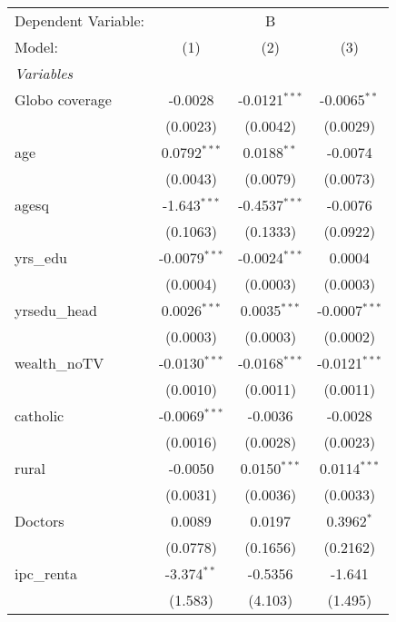 
\begingroup
\centering
\begin{tabular}{lccc}
   \tabularnewline \midrule \midrule
   Dependent Variable: & \multicolumn{3}{c}{B}\\
   Model:         & (1)             & (2)             & (3)\\  
   \midrule
   \emph{Variables}\\
   Globo coverage & -0.0028         & -0.0121$^{***}$ & -0.0065$^{**}$\\   
                  & (0.0023)        & (0.0042)        & (0.0029)\\   
   age            & 0.0792$^{***}$  & 0.0188$^{**}$   & -0.0074\\   
                  & (0.0043)        & (0.0079)        & (0.0073)\\   
   agesq          & -1.643$^{***}$  & -0.4537$^{***}$ & -0.0076\\   
                  & (0.1063)        & (0.1333)        & (0.0922)\\   
   yrs\_edu       & -0.0079$^{***}$ & -0.0024$^{***}$ & 0.0004\\   
                  & (0.0004)        & (0.0003)        & (0.0003)\\   
   yrsedu\_head   & 0.0026$^{***}$  & 0.0035$^{***}$  & -0.0007$^{***}$\\   
                  & (0.0003)        & (0.0003)        & (0.0002)\\   
   wealth\_noTV   & -0.0130$^{***}$ & -0.0168$^{***}$ & -0.0121$^{***}$\\   
                  & (0.0010)        & (0.0011)        & (0.0011)\\   
   catholic       & -0.0069$^{***}$ & -0.0036         & -0.0028\\   
                  & (0.0016)        & (0.0028)        & (0.0023)\\   
   rural          & -0.0050         & 0.0150$^{***}$  & 0.0114$^{***}$\\   
                  & (0.0031)        & (0.0036)        & (0.0033)\\   
   Doctors        & 0.0089          & 0.0197          & 0.3962$^{*}$\\   
                  & (0.0778)        & (0.1656)        & (0.2162)\\   
   ipc\_renta     & -3.374$^{**}$   & -0.5356         & -1.641\\   
                  & (1.583)         & (4.103)         & (1.495)\\   

\end{tabular}
